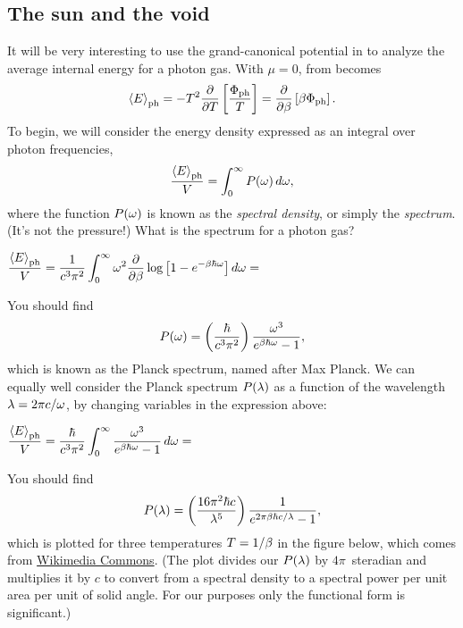 \subsection{\label{sec:planck}The sun and the void}
It will be very interesting to use the grand-canonical potential in  to analyze the average internal energy for a photon gas.
With $\mu = 0$,  from  becomes
\begin{equation*}
  \left\langle E \right\rangle_{\text{ph}} = -T^2 \frac{\partial }{\partial T} \left[\frac{\Phi_{\text{ph}}}{T}\right] = \frac{\partial }{\partial \beta} \left[\beta \Phi_{\text{ph}}\right].
\end{equation*}
To begin, we will consider the energy density expressed as an integral over photon frequencies,
\begin{equation*}
  \frac{\left\langle E \right\rangle_{\text{ph}}}{V} = \int_0^{\infty} P(\omega) \mathop{d\omega},
\end{equation*}
where the function $P(\omega)$ is known as the \textit{spectral density}, or simply the \textit{spectrum}.
(It's not the pressure!)
What is the spectrum for a photon gas?
\begin{mdframed}
  $\displaystyle \frac{\left\langle E \right\rangle_{\text{ph}}}{V} = \frac{1}{c^3 \pi^2} \int_0^{\infty} \omega^2 \frac{\partial }{\partial \beta} \log\left[1 - e^{-\beta \hbar \omega}\right] \mathop{d\omega} = $ \\[120 pt] %
\end{mdframed}

You should find
\begin{equation}
  \label{eq:Planck_omega}
  P(\omega) = \left(\frac{\hbar}{c^3 \pi^2}\right) \frac{\omega^3}{e^{\beta \hbar \omega} - 1},
\end{equation}
which is known as the Planck spectrum, named after Max Planck.
We can equally well consider the Planck spectrum $P(\lambda)$ as a function of the wavelength $\lambda = 2\pi c / \omega$, by changing variables in the expression above:
\begin{mdframed}
  $\displaystyle \frac{\left\langle E \right\rangle_{\text{ph}}}{V} = \frac{\hbar}{c^3 \pi^2} \int_0^{\infty} \frac{\omega^3}{e^{\beta \hbar \omega} - 1} \mathop{d\omega} = $ \\[120 pt] %
\end{mdframed}

You should find
\begin{equation}
  \label{eq:Planck_la}
  P(\lambda) = \left(\frac{16\pi^2 \hbar c}{\lambda^5}\right) \frac{1}{e^{2\pi\beta \hbar c / \lambda} - 1},
\end{equation}
which is plotted for three temperatures $T = 1 / \beta$ in the figure below, which comes from \href{https://commons.wikimedia.org/wiki/File:Black_body.svg}{Wikimedia Commons}.
(The plot divides our $P(\lambda)$ by $4\pi$~steradian and multiplies it by $c$ to convert from a spectral density to a spectral power per unit area per unit of solid angle.  For our purposes only the functional form is significant.)


